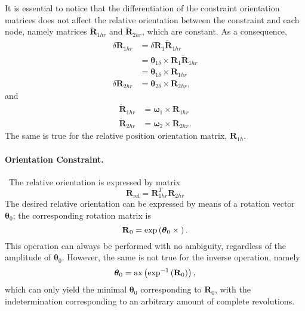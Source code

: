 \documentclass[10pt,dvips,fleqn,subeqn]{report}
\newcommand{\T}[1]{\bm{\mathbf{#1}}}
\begin{document}
It is essential to notice that the differentiation of the constraint
orientation matrices does not affect the relative orientation between
the constraint and each node, namely matrices $\tilde{\T{R}}_{1hr}$
and $\tilde{\T{R}}_{2hr}$, which are constant.
As a consequence,
\begin{subequations}
\begin{align}
	\delta\T{R}_{1hr}
		&= \delta\T{R}_1 \tilde{\T{R}}_{1hr} \nonumber \\
		&= \T{\theta}_{1\delta} \times \T{R}_1 \tilde{\T{R}}_{1hr} \nonumber \\
		&= \T{\theta}_{1\delta}\times \T{R}_{1hr} \\
	\delta\T{R}_{2hr} &= \T{\theta}_{2\delta}\times \T{R}_{2hr} ,
\end{align}
\end{subequations}
and
\begin{align}
	\dot{\T{R}}_{1hr} &= \T{\omega}_1 \times \T{R}_{1hr} \\
	\dot{\T{R}}_{2hr} &= \T{\omega}_2 \times \T{R}_{2hr} .
\end{align}
The same is true for the relative position orientation matrix,
$\T{R}_{1h}$.


\paragraph{Orientation Constraint.} \
The relative orientation is expressed by matrix
\begin{equation}
	\T{R}_{\mathrm{rel}} = \T{R}_{1hr}^T \T{R}_{2hr}
\end{equation}
The desired relative orientation can be expressed by means
of a rotation vector $\T{\theta}_0$;
the corresponding rotation matrix is
\begin{equation}
	\T{R}_0 = \exp\plbr{\T{\theta}_0\times{}} .
\end{equation}
This operation can always be performed with no ambiguity,
regardless of the amplitude of $\T{\theta}_0$.
However, the same is not true for the inverse operation, namely
\begin{equation}
	\T{\theta}_0 = \mathrm{ax}\plbr{\exp^{-1}\plbr{\T{R}_0}} ,
\end{equation}
which can only yield the minimal $\T{\theta}_0$ corresponding
to $\T{R}_0$,
with the indetermination corresponding to an arbitrary amount 
of complete revolutions.
\end{document}
